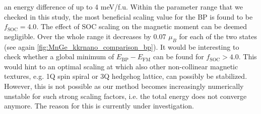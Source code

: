 \documentclass[graybox]{svmult}
\begin{document}
an energy difference of up to 4 meV/f.u.
Within the parameter range that we checked in this study,
the most beneficial scaling value for the BP is found to be $f_{\text{SOC}}=4.0$.
The effect of SOC scaling on the magnetic moment can be deemed negligible. Over the whole
range it decreases by 0.07 $\mu_{B}$ for each of the two states
(see again \cref{fig:MnGe_kkrnano_comparison_bp}).
It would be interesting to check whether a global minimum of $E_{\text{BP}}-E_{\text{FM}}$ can
be found for $f_{\text{SOC}} > 4.0$. This would hint to an optimal
scaling at which also other non-collinear magnetic textures, e.g. 1Q spin spiral or
3Q hedgehog lattice, can possibly be stabilized.
However, this is not possible as our method becomes increasingly numerically unstable for 
such strong scaling factors, i.e. the total energy does not converge anymore.
The reason for this is currently under investigation.
\end{document}
